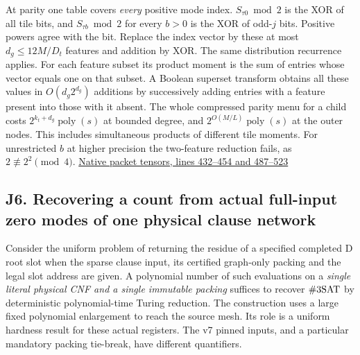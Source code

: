 \documentclass[11pt,a4paper]{article}
\begin{document}
At parity one table covers \emph{every} positive mode index.
\(S_{\tau0}\bmod2\) is the XOR of all tile bits, and
\(S_{\tau b}\bmod2\) for every \(b>0\) is the XOR of odd-\(j\) bits.
Positive powers agree with the bit. Replace the index vector by these at
most \(d_g\le12M/D_t\) features and addition by XOR. The same
distribution recurrence applies. For each feature subset its product
moment is the sum of entries whose vector equals one on that subset. A
Boolean superset transform obtains all these values in \(O(d_g2^{d_g})\)
additions by successively adding entries with a feature present into
those with it absent. The whole compressed parity menu for a child costs
\(2^{k_t+d_g}\operatorname{poly}(s)\) at bounded degree, and
\(2^{O(M/L)}\operatorname{poly}(s)\) at the outer nodes. This includes
simultaneous products of different tile moments. For unrestricted \(b\)
at higher precision the two-feature reduction fails, as
\(2\not\equiv2^2\pmod4\).
\href{https://github.com/openai/math/blob/main/preprints/The-Exponential-Time-Hypothesis-is-False-October-25-2026/build/quantitative-contraction.tex\#L432}{Native
packet tensors, lines 432--454 and 487--523}

\subsection{J6. Recovering a count from actual full-input zero modes of
one physical clause
network}\label{v9-j6-recovering-a-count-from-actual-full-input-zero-modes-of-one-physical-clause-network}

Consider the uniform problem of returning the residue of a specified
completed D root slot when the sparse clause input, its certified
graph-only packing and the legal slot address are given. A polynomial
number of such evaluations on a \emph{single literal physical CNF and a
single immutable packing} suffices to recover \(\#3{\rm SAT}\) by
deterministic polynomial-time Turing reduction. The construction uses a
large fixed polynomial enlargement to reach the source mesh. Its role is
a uniform hardness result for these actual registers. The v7 pinned
inputs, and a particular mandatory packing tie-break, have different
quantifiers.
\end{document}
